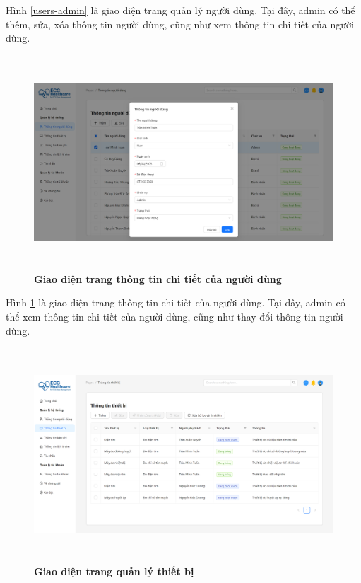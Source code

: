 Hình \ref{users-admin} là giao diện trang quản lý người dùng. Tại đây, admin có thể thêm, sửa, xóa thông tin người dùng, cũng như xem thông tin chi tiết của người dùng.

\begin{figure}[H]
	\centering
	\includegraphics[width=15cm,height=8cm]{Images/admin_ui/user-detail.png}
	\caption[Giao diện trang thông tin chi tiết của người dùng]{\bfseries \fontsize{12pt}{0pt}\selectfont Giao diện trang thông tin chi tiết của người dùng}
	\label{user-detail-admin}
\end{figure}

Hình \ref{user-detail-admin} là giao diện trang thông tin chi tiết của người dùng. Tại đây, admin có thể xem thông tin chi tiết của người dùng, cũng như thay đổi thông tin người dùng.

\begin{figure}[H]
	\centering
	\includegraphics[width=15cm,height=8cm]{Images/admin_ui/devices.png}
	\caption[Giao diện trang quản lý thiết bị]{\bfseries \fontsize{12pt}{0pt}\selectfont Giao diện trang quản lý thiết bị}
	\label{devices-admin}
\end{figure}

